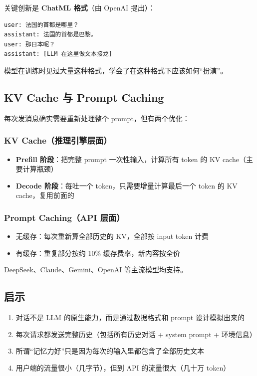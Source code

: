 关键创新是 \textbf{ChatML 格式}（由 OpenAI 提出）：

\begin{lstlisting}
user: 法国的首都是哪里？
assistant: 法国的首都是巴黎。
user: 那日本呢？
assistant: [LLM 在这里做文本接龙]
\end{lstlisting}

模型在训练时见过大量这种格式，学会了在这种格式下应该如何``扮演''。

\subsection{KV Cache 与 Prompt Caching}

每次发消息确实需要重新处理整个 prompt，但有两个优化：

\subsubsection{KV Cache（推理引擎层面）}

\begin{itemize}
  \item \textbf{Prefill 阶段}：把完整 prompt 一次性输入，计算所有 token 的 KV cache（主要计算瓶颈）
  \item \textbf{Decode 阶段}：每吐一个 token，只需要增量计算最后一个 token 的 KV cache，复用前面的
\end{itemize}

\subsubsection{Prompt Caching（API 层面）}

\begin{itemize}
  \item 无缓存：每次重新算全部历史的 KV，全部按 input token 计费
  \item 有缓存：重复部分按约 10\% 缓存费率，新内容按全价
\end{itemize}

DeepSeek、Claude、Gemini、OpenAI 等主流模型均支持。

\subsection{启示}

\begin{enumerate}
  \item 对话不是 LLM 的原生能力，而是通过数据格式和 prompt 设计模拟出来的
  \item 每次请求都发送完整历史（包括所有历史对话 + system prompt + 环境信息）
  \item 所谓``记忆力好''只是因为每次的输入里都包含了全部历史文本
  \item 用户端的流量很小（几字节），但到 API 的流量很大（几十万 token）
\end{enumerate}
